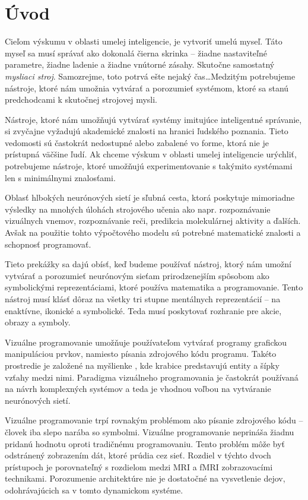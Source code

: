 

\chapter*{Úvod}

Cieľom výskumu v oblasti umelej inteligencie, je vytvoriť umelú myseľ. Táto myseľ sa musí správať ako dokonalá čierna skrinka -- žiadne nastaviteľné parametre, žiadne ladenie a žiadne vnútorné zásahy. Skutočne samostatný \emph{mysliaci stroj}. Samozrejme, toto potrvá ešte nejaký čas\dots Medzitým potrebujeme nástroje, ktoré nám umožnia vytvárať a porozumieť systémom, ktoré sa stanú predchodcami k skutočnej strojovej mysli.

Nástroje, ktoré nám umožňujú vytvárať systémy imitujúce inteligentné správanie, si zvyčajne vyžadujú akademické znalosti na hranici ľudského poznania. Tieto vedomosti sú častokrát nedostupné alebo zabalené vo forme, ktorá nie je prístupná väčšine ľudí. Ak chceme výskum v oblasti umelej inteligencie urýchliť, potrebujeme nástroje, ktoré umožňujú experimentovanie s takýmito systémami len s minimálnymi znalosťami.

Oblasť hlbokých neurónových sietí je sľubná cesta, ktorá poskytuje mimoriadne výsledky na mnohých úlohách strojového učenia ako napr. rozpoznávanie vizuálnych vnemov, rozpoznávanie reči, predikcia molekulárnej aktivity a ďalších. Avšak na použitie tohto výpočtového modelu sú potrebné matematické znalosti a schopnosť programovať.

Tieto prekážky sa dajú obísť, keď budeme používať nástroj, ktorý nám umožní vytvárať a porozumieť neurónovým sieťam prirodzenejším spôsobom ako symbolickými reprezentáciami, ktoré používa matematika a programovanie. Tento nástroj musí klásť dôraz na všetky tri stupne mentálnych reprezentácií -- na enaktívne, ikonické a symbolické. Teda musí poskytovať rozhranie pre akcie, obrazy a symboly.

Vizuálne programovanie umožňuje používateľom vytvárať programy grafickou manipuláciou prvkov, namiesto písania zdrojového kódu programu. Takéto prostredie je založené na myšlienke , kde krabice predstavujú entity a šípky vzťahy medzi nimi. Paradigma vizuálneho programovania je častokrát používaná na návrh komplexných systémov a teda je vhodnou voľbou na vytváranie neurónových sietí.

Vizuálne programovanie trpí rovnakým problémom ako písanie zdrojového kódu -- človek iba slepo narába so symbolmi. Vizuálne programovanie neprináša žiadnu pridanú hodnotu oproti tradičnému programovaniu. Tento problém môže byť odstránený zobrazením dát, ktoré prúdia cez sieť. Rozdiel v týchto dvoch prístupoch je porovnateľný s rozdielom medzi MRI a fMRI zobrazovacími technikami. Porozumenie architektúre nie je dostatočné na vysvetlenie dejov, odohrávajúcich sa v tomto dynamickom systéme.

